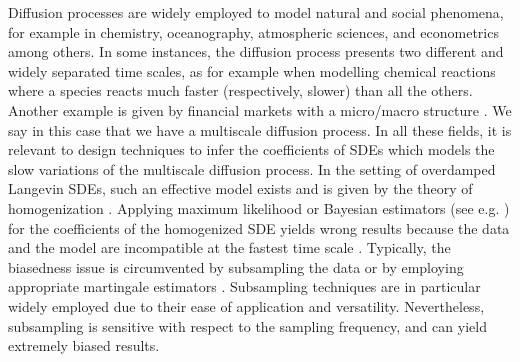 \documentclass[10pt]{article}
\begin{document}
Diffusion processes are widely employed to model natural and social phenomena, for example in chemistry, oceanography, atmospheric sciences, and econometrics among others. In some instances, the diffusion process presents two different and widely separated time scales, as for example when modelling chemical reactions where a species reacts much faster (respectively, slower) than all the others. Another example is given by financial markets with a micro/macro structure \cite{AiJ14}. We say in this case that we have a multiscale diffusion process. In all these fields, it is relevant to design techniques to infer the coefficients of SDEs which models the slow variations of the multiscale diffusion process. In the setting of overdamped Langevin SDEs, such an effective model exists and is given by the theory of homogenization \cite{BLP78,PaS08}. Applying maximum likelihood or Bayesian estimators (see e.g. \cite{PSV09,PSZ13,LiS01,LiS01b}) for the coefficients of the homogenized SDE yields wrong results because the data and the model are incompatible at the fastest time scale \cite{PaS07}. Typically, the biasedness issue is circumvented by subsampling the data \cite{PaS07} or by employing appropriate martingale estimators \cite{KPP15,KKP15}. Subsampling techniques are in particular widely employed \cite{ZMA05} due to their ease of application and versatility. Nevertheless, subsampling is sensitive with respect to the sampling frequency, and can yield extremely biased results.
\end{document}
